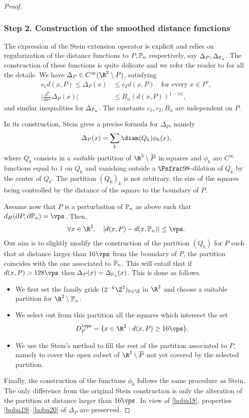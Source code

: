 \begin{proof}
\subsubsection*{Step 2. Construction of the smoothed distance functions} The expression of the Stein extension operator is explicit and relies on regularization of the distance functions to $P, \Bbb P_n$ respectively, say $\Delta_P, \Delta_{\Bbb P_n}$. The construction of these functions is quite delicate and we refer the reader to \cite[Th.\,2, p.\,171]{St70} for all the details. We have $\Delta_P \in C^\infty(\R^2 \setminus\nobreak P)$, satisfying
\begin{align}\label{bobu19}
c_1 d(x, P)\le \Delta _P (x) &\le c_2 d(x, P) \quad\text{for every } x \in P^c,
\\
\label{bobu20}
\Big |\frac{\partial^\alpha}{\partial x^\alpha} \Delta_P (x)\Big |&\le B_\alpha (d(x, P))^{1-|\alpha|},
\end{align}
and similar inequalities for $\Delta_{\Bbb P_n}$. The constants $c_1,c_2, B_\alpha$ are independent on $P$.

In its construction, Stein gives a precise formula for $\Delta_P$, namely
\[
\Delta_P(x) = \sum_k \diam (Q_k) \phi_k(x),
\]
where $Q_k$ consists in a {\it suitable} partition of $\R^2\setminus \overline P$ in squares and $\phi_k$ are $C^\infty$ functions equal to $1$ on $Q_k$ and vanishing outside a $\Psfrac 98$-dilation of $Q_k$ by the center of $Q_k$. The partition $(Q_k)_k$ is not arbitrary, the size of the squares being controlled by the distance of the square to the boundary of $P$.

Assume now that $P$ is a perturbation of $\Bbb P_n$ as above such that $d_H(\partial P, \partial \Bbb P_n) =\vps$. Then,
\begin{equation}\label{bobu18}
\forall x \in \R^2, \quad |d(x, P)-d(x, \Bbb P_n)| \le \vps.
\end{equation}
Our aim is to slightly modify the construction of the partition $(Q_k)$ for $P$ such that at distance larger than $16 \vps$ from the boundary of $P$, the partition coincides with the one associated to $\Bbb P_n$. This will entail that if $d(x, P) > 128 \vps$ then $\Delta_P(x) =\Delta_{\Bbb P_n}(x)$. This is done as follows.
\begin{itemize}
\item We first set the family grids $(2^{-k} \Z^2)_{k \in \Z}$ in $\R^2$ and choose a suitable partition for $\R^2\setminus \Bbb P_n$.
\item We select out from this partition all the squares which intersect the set
\[
D^\vps_P=\{x\in \R^2 : d(x, P) \ge 16 \vps\}.
\]
\item We use the Stein's method to fill the rest of the partition associated to $P$, namely to cover the open subset of $\R^2 \setminus \overline P$ not yet covered by the selected partition.
\end{itemize}
Finally, the construction of the functions $\phi_k$ follows the same procedure as Stein. The only difference from the original Stein construction is only the alteration of the partition at distance larger than $16\vps$. In view of \eqref{bobu18}, properties \eqref{bobu19}--\eqref{bobu20} of $\Delta_P$ are preserved.


\end{proof}
